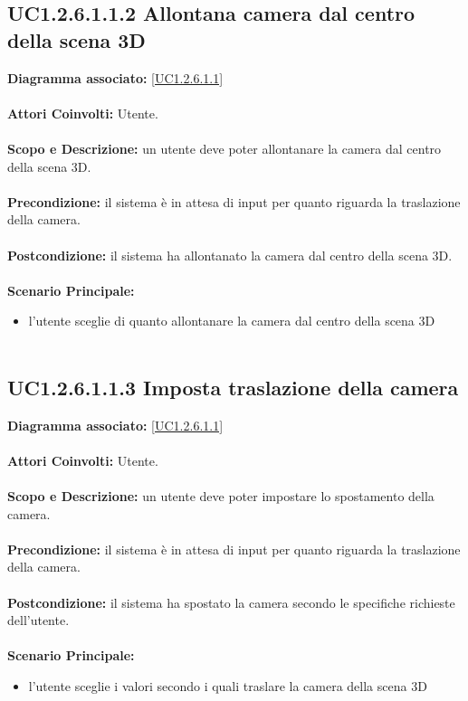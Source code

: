 \subsection{UC1.2.6.1.1.2 Allontana camera dal centro della scena 3D}
\textbf{Diagramma associato:}
\ref{UC1.2.6.1.1} \\ \\
\textbf{Attori Coinvolti:}
Utente. \\ \\
\textbf{Scopo e Descrizione:}
un utente deve poter allontanare la camera dal centro della scena 3D. \\ \\
\textbf{Precondizione:}
il sistema è in attesa di input per quanto riguarda la traslazione della camera. \\ \\
\textbf{Postcondizione:}
il sistema ha allontanato la camera dal centro della scena 3D. \\ \\
\textbf{Scenario Principale:}
\begin{itemize}
\item l'utente sceglie di quanto allontanare la camera dal centro della scena 3D
\\ \\ \end{itemize}


\subsection{UC1.2.6.1.1.3 Imposta traslazione della camera}
\textbf{Diagramma associato:}
\ref{UC1.2.6.1.1} \\ \\
\textbf{Attori Coinvolti:}
Utente. \\ \\
\textbf{Scopo e Descrizione:}
un utente deve poter impostare lo spostamento della camera. \\ \\
\textbf{Precondizione:}
il sistema è in attesa di input per quanto riguarda la traslazione della camera. \\ \\
\textbf{Postcondizione:}
il sistema ha spostato la camera secondo le specifiche richieste dell'utente. \\ \\
\textbf{Scenario Principale:}
\begin{itemize}
\item l'utente sceglie i valori secondo i quali traslare la camera della scena 3D
\\ \\ \end{itemize}


